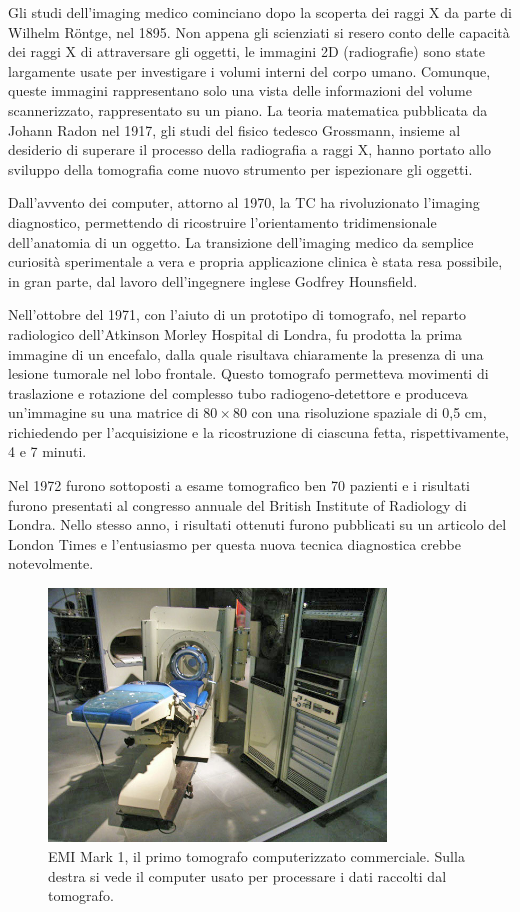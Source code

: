\documentclass[12pt,a4paper]{report}
\begin{document}
Gli studi dell'imaging medico cominciano dopo la scoperta dei raggi X da parte di Wilhelm Röntge, nel 1895.
Non appena gli scienziati si resero conto delle capacità dei raggi X di attraversare gli oggetti, le immagini 2D (radiografie)
sono state largamente usate per investigare i volumi interni del corpo umano.
Comunque, queste immagini rappresentano solo una vista delle informazioni del volume scannerizzato, rappresentato su un piano.
La teoria matematica pubblicata da Johann Radon nel 1917, gli studi del fisico tedesco Grossmann, insieme al desiderio di superare
il processo della radiografia a raggi X, hanno portato allo sviluppo della tomografia come nuovo strumento per ispezionare gli
oggetti.

Dall'avvento dei computer, attorno al 1970, la TC ha rivoluzionato l'imaging diagnostico, permettendo di ricostruire
l'orientamento tridimensionale dell'anatomia di un oggetto.
La transizione dell'imaging medico da semplice curiosità sperimentale a vera e propria applicazione clinica è stata resa
possibile, in gran parte, dal lavoro dell'ingegnere inglese Godfrey Hounsfield.

Nell'ottobre del 1971, con l'aiuto di un prototipo di tomografo, nel reparto radiologico dell'Atkinson Morley Hospital di Londra,
fu prodotta la prima immagine di un encefalo, dalla quale risultava chiaramente la presenza di una lesione tumorale nel lobo
frontale.
Questo tomografo permetteva movimenti di traslazione e rotazione del complesso tubo radiogeno-detettore e produceva un'immagine su
una matrice di \(80 \times 80\) con una risoluzione spaziale di 0,5 cm, richiedendo per l'acquisizione e la ricostruzione di
ciascuna fetta, rispettivamente, 4 e 7 minuti.

Nel 1972 furono sottoposti a esame tomografico ben 70 pazienti e i risultati furono presentati al congresso annuale del British
Institute of Radiology di Londra.
Nello stesso anno, i risultati ottenuti furono pubblicati su un articolo del London Times e l'entusiasmo per questa nuova tecnica
diagnostica crebbe notevolmente.

\begin{figure}[H]
  \centering
  \includegraphics[width=0.8\textwidth]{scanner-Mark-I}
  \caption{\label{fig:history_mark_1} EMI Mark 1, il primo tomografo computerizzato commerciale.
           Sulla destra si vede il computer usato per processare i dati raccolti dal tomografo.}
\end{figure}
\end{document}
